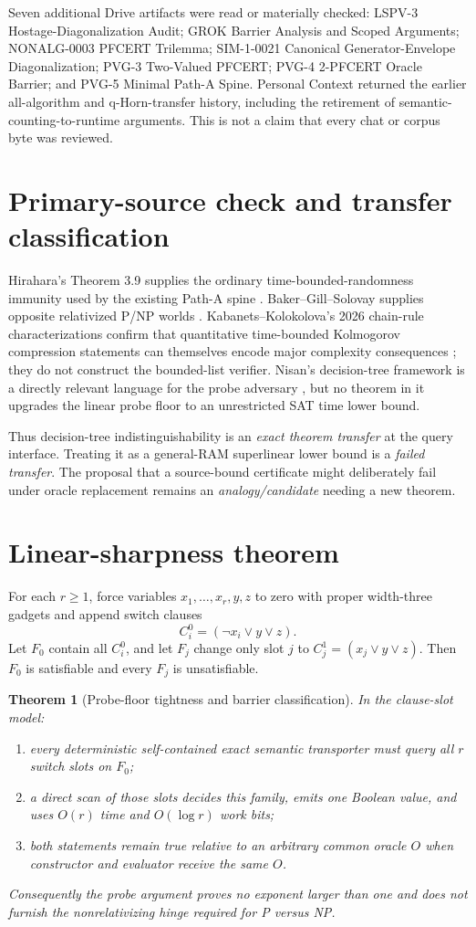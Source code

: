 \documentclass[11pt]{article}
\newtheorem{theorem}{Theorem}
\begin{document}
Seven additional Drive artifacts were read or materially checked:
LSPV-3 Hostage-Diagonalization Audit; GROK Barrier Analysis and Scoped
Arguments; NONALG-0003 PFCERT Trilemma; SIM-1-0021 Canonical
Generator-Envelope Diagonalization; PVG-3 Two-Valued PFCERT; PVG-4
2-PFCERT Oracle Barrier; and PVG-5 Minimal Path-A Spine. Personal Context
returned the earlier all-algorithm and q-Horn-transfer history, including
the retirement of semantic-counting-to-runtime arguments. This is not a
claim that every chat or corpus byte was reviewed.

\section{Primary-source check and transfer classification}
Hirahara's Theorem 3.9 supplies the ordinary time-bounded-randomness
immunity used by the existing Path-A spine
\cite{hirahara2020}. Baker--Gill--Solovay supplies opposite relativized
P/NP worlds \cite{bgs1975}. Kabanets--Kolokolova's 2026 chain-rule
characterizations confirm that quantitative time-bounded Kolmogorov
compression statements can themselves encode major complexity
consequences \cite{kk2026}; they do not construct the bounded-list
verifier. Nisan's decision-tree framework is a directly relevant
language for the probe adversary \cite{nisan1991}, but no theorem in it
upgrades the linear probe floor to an unrestricted SAT time lower bound.

Thus decision-tree indistinguishability is an \emph{exact theorem
transfer} at the query interface. Treating it as a general-RAM
superlinear lower bound is a \emph{failed transfer}. The proposal that a
source-bound certificate might deliberately fail under oracle replacement
remains an \emph{analogy/candidate} needing a new theorem.

\section{Linear-sharpness theorem}
For each $r\ge1$, force variables $x_1,\ldots,x_r,y,z$ to zero with
proper width-three gadgets and append switch clauses
\[
 C_i^0=(\neg x_i\vee y\vee z).
\]
Let $F_0$ contain all $C_i^0$, and let $F_j$ change only slot $j$ to
$C_j^1=(x_j\vee y\vee z)$. Then $F_0$ is satisfiable and every $F_j$
is unsatisfiable.

\begin{theorem}[Probe-floor tightness and barrier classification]
In the clause-slot model:
\begin{enumerate}
\item every deterministic self-contained exact semantic transporter must
query all $r$ switch slots on $F_0$;
\item a direct scan of those slots decides this family, emits one Boolean
value, and uses $O(r)$ time and $O(\log r)$ work bits;
\item both statements remain true relative to an arbitrary common oracle
$O$ when constructor and evaluator receive the same $O$.
\end{enumerate}
Consequently the probe argument proves no exponent larger than one and
does not furnish the nonrelativizing hinge required for P versus NP.
\end{theorem}
\end{document}
